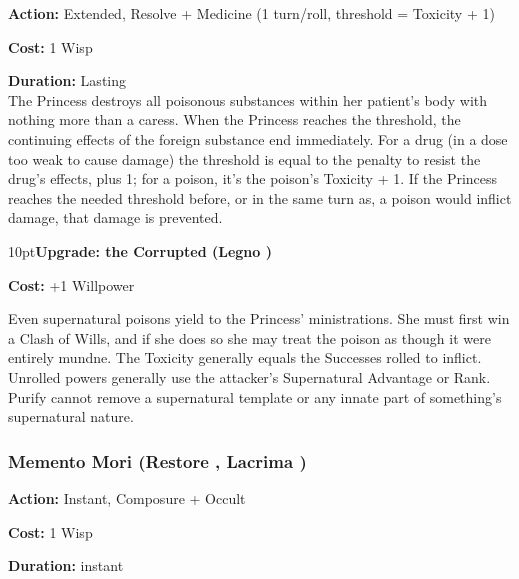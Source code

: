 \noindent \textbf{Action:} Extended, Resolve + Medicine (1 turn/roll, threshold = Toxicity + 1)

\noindent \textbf{Cost:} 1 Wisp

\noindent \textbf{Duration:} Lasting \\

\noindent The Princess destroys all poisonous substances within her patient's body with nothing more than a caress. When the Princess reaches the threshold, the continuing effects of the foreign substance end immediately. For a drug (in a dose too weak to cause damage) the threshold is equal to the penalty to resist the drug's effects, plus 1; for a poison, it's the poison's Toxicity + 1. If the Princess reaches the needed threshold before, or in the same turn as, a poison would inflict damage, that damage is prevented.

\begin{myindentpar}{10pt}\textbf{Upgrade: the Corrupted (Legno  \textbullet\textbullet\textbullet)}

\noindent \textbf{Cost:} +1 Willpower

Even supernatural poisons yield to the Princess' ministrations. She must first win a Clash of Wills, and if she does so she may treat the poison as though it were entirely mundne. The Toxicity generally equals the Successes rolled to inflict. Unrolled powers generally use the attacker's Supernatural Advantage or Rank. Purify cannot remove a supernatural template or any innate part of something's supernatural nature.\end{myindentpar}

\subsubsection*{Memento Mori (Restore \textbullet\textbullet, Lacrima \textbullet)}

\noindent \textbf{Action:} Instant, Composure + Occult

\noindent \textbf{Cost:} 1 Wisp

\noindent \textbf{Duration:} instant \\

